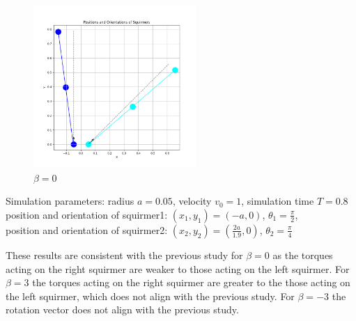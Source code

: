 \documentclass{article}
\begin{document}
\begin{figure}[H]
    \centering
    \includegraphics[width=0.55\textwidth]{graphs/simulations/sim_sq_sq/beta0/pi_4_.png}
    \caption{\footnotesize $\beta = 0$}
\end{figure}
\begin{center}
    Simulation parameters: radius $a=0.05$, velocity $v_0=1$, simulation time $T=0.8$\\
        position and orientation of squirmer1: $(x_1,y_1)=(-a,0)$, $\theta_1=\frac{\pi}{2}$,\\
        position and orientation of squirmer2: $(x_2,y_2)=(\frac{2a}{1.9},0)$, $\theta_2=\frac{\pi}{4}$
\end{center}
These results are consistent with the previous study\cite{Stark} for $\beta = 0$ as the torques acting on the right 
squirmer are weaker to those acting on the left squirmer. For $\beta = 3$ the torques acting on the right squirmer are
greater to the those acting on the left squirmer, which does not align with the previous study.
For $\beta = -3$ the rotation vector does not align with the previous study.
\end{document}

